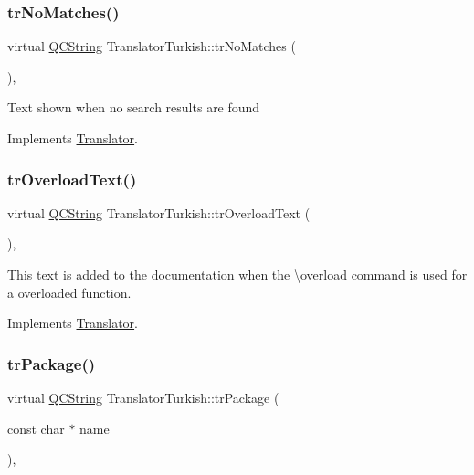\subsubsection{\texorpdfstring{trNoMatches()}{trNoMatches()}}
{\footnotesize\ttfamily virtual \mbox{\hyperlink{class_q_c_string}{Q\+C\+String}} Translator\+Turkish\+::tr\+No\+Matches (\begin{DoxyParamCaption}{ }\end{DoxyParamCaption})\hspace{0.3cm}{\ttfamily [inline]}, {\ttfamily [virtual]}}

Text shown when no search results are found 

Implements \mbox{\hyperlink{class_translator}{Translator}}.

\mbox{\label{class_translator_turkish_a0d11d52db841e0bef7abe4fd0ee1d82c}} 
\subsubsection{\texorpdfstring{trOverloadText()}{trOverloadText()}}
{\footnotesize\ttfamily virtual \mbox{\hyperlink{class_q_c_string}{Q\+C\+String}} Translator\+Turkish\+::tr\+Overload\+Text (\begin{DoxyParamCaption}{ }\end{DoxyParamCaption})\hspace{0.3cm}{\ttfamily [inline]}, {\ttfamily [virtual]}}

This text is added to the documentation when the \textbackslash{}overload command is used for a overloaded function. 

Implements \mbox{\hyperlink{class_translator}{Translator}}.

\mbox{\label{class_translator_turkish_a5a704997f6670e8a6aac6bd76396cec0}} 
\subsubsection{\texorpdfstring{trPackage()}{trPackage()}}
{\footnotesize\ttfamily virtual \mbox{\hyperlink{class_q_c_string}{Q\+C\+String}} Translator\+Turkish\+::tr\+Package (\begin{DoxyParamCaption}\item[{const char $\ast$}]{name }\end{DoxyParamCaption})\hspace{0.3cm}{\ttfamily [inline]}, {\ttfamily [virtual]}}

